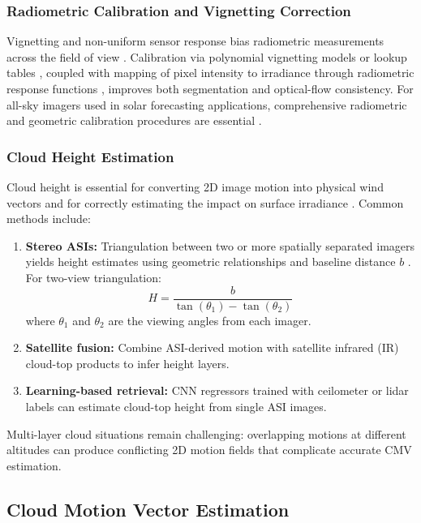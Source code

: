 \subsubsection*{Radiometric Calibration and Vignetting Correction}
Vignetting and non-uniform sensor response bias radiometric measurements across the field of view \cite{kim2008,lebourgeois2008}. Calibration via polynomial vignetting models or lookup tables \cite{lebourgeois2008,kuusk2007}, coupled with mapping of pixel intensity to irradiance through radiometric response functions \cite{kim2008}, improves both segmentation and optical-flow consistency. For all-sky imagers used in solar forecasting applications, comprehensive radiometric and geometric calibration procedures are essential \cite{urquhart2015dev,urquhart2016}.

\subsubsection*{Cloud Height Estimation}
Cloud height is essential for converting 2D image motion into physical wind vectors and for correctly estimating the impact on surface irradiance \cite{nouri2019}. Common methods include:
\begin{enumerate}
  \item \textbf{Stereo ASIs:} Triangulation between two or more spatially separated imagers yields height estimates using geometric relationships and baseline distance $b$ \cite{yang2014}. For two-view triangulation:
  \[
  H = \frac{b}{\tan(\theta_1)-\tan(\theta_2)}
  \]
  where $\theta_1$ and $\theta_2$ are the viewing angles from each imager.
  \item \textbf{Satellite fusion:} Combine ASI-derived motion with satellite infrared (IR) cloud-top products to infer height layers.
  \item \textbf{Learning-based retrieval:} CNN regressors trained with ceilometer or lidar labels can estimate cloud-top height from single ASI images.
\end{enumerate}

Multi-layer cloud situations remain challenging: overlapping motions at different altitudes can produce conflicting 2D motion fields that complicate accurate CMV estimation.

\subsection{Cloud Motion Vector Estimation}
\label{sec:cmv_estimation}

